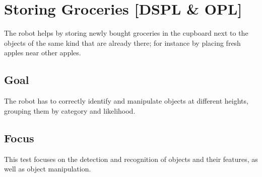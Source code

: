 \section{Storing Groceries [DSPL \& OPL]}
The robot helps by storing newly bought groceries in the cupboard next to the objects of the same kind that are already there; for instance by placing fresh apples near other apples.

\subsection{Goal}
The robot has to correctly identify and manipulate objects at different heights, grouping them by category and likelihood.

\subsection{Focus}
This test focuses on the detection and recognition of objects and their features, as well as object manipulation.

